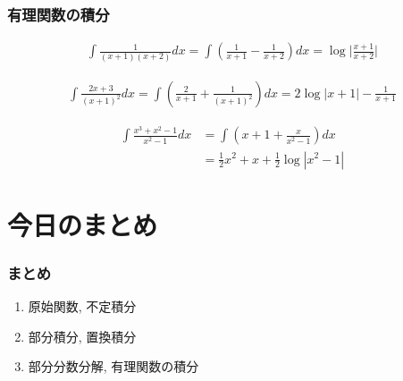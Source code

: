 \documentclass[dvipdfmx,cjk,10.2pt]{beamer}
\theoremstyle{definition}
\begin{document}
\begin{frame}
\frametitle{有理関数の積分}

\begin{align*}
\int \frac{1}{(x+1)(x+2)} dx  = \int (\frac{1}{x+1}-\frac{1}{x+2})dx = \log\Big|\frac{x+1}{x+2}\Big|
\end{align*}

\begin{align*}
\int \frac{2x+3}{(x+1)^2} dx  = \int (\frac{2}{x+1}+\frac{1}{(x+1)^2})dx = 2\log|x+1| - \frac{1}{x+1}
\end{align*}

\begin{align*}
\int \frac{x^3+x^2-1}{x^2-1}dx & = \int (x+1 +\frac{x}{x^2-1})dx \\
& = \frac{1}{2}x^2+x+\frac{1}{2}\log|x^2-1|
\end{align*}

\end{frame}









\section{今日のまとめ}
\begin{frame}
\frametitle{まとめ}   


\begin{enumerate}
\item 原始関数, 不定積分
\item 部分積分, 置換積分
\item 部分分数分解, 有理関数の積分
\end{enumerate} 

\end{frame}
\end{document}
